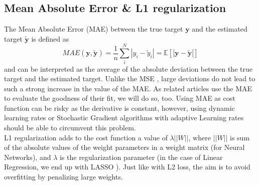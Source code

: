\documentclass[11pt,a4paper,notitlepage]{article}
\begin{document}
\subsection{Mean Absolute Error \& L1 regularization}
The Mean Absolute Error (MAE) between the true target $\bm{y}$ and the estimated target $\bm{\tilde y}$  is defined as 
\begin{equation}\label{MSE}
MAE(\bm{y},\bm{\tilde y})=\frac{1}{n}\sum_i^N\left|y_i - \tilde y_i \right|=\mathbb{E}\left[|\bm{y}-\bm{\tilde y}|  \right]
\end{equation}
and can be interpreted as the average of the absolute deviation between the true target and the estimated target. Unlike the MSE \citep{Project1}, large deviations do not lead to such a strong increase in the value of the MAE. As related articles use the MAE to evaluate the goodness of their fit, we will do so, too. Using MAE as cost function can be risky as the derivative is constant, however, using dynamic learning rates or Stochastic Gradient algorithms with adaptive Learning rates should be able to circumvent this problem. \\

L1 regularization adds to the cost function a value of $\lambda||W||$, where $||W||$ is sum of the absolute values of the weight parameters in a weight matrix (for Neural Networks), and $\lambda$ is the regularization parameter (in the case of Linear Regression, we end up with LASSO \citep{Project1}). Just like with L2 loss, the aim is to avoid overfitting by penalizing large weights.
\end{document}
